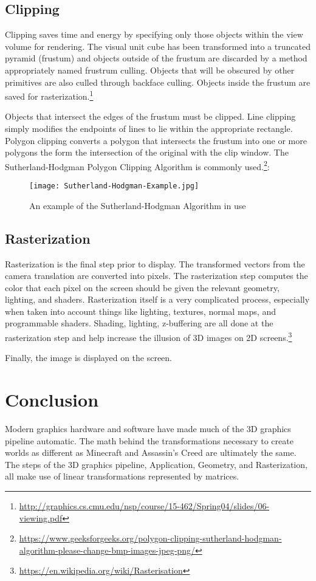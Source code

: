 \documentclass{article}
\begin{document}
\subsection{Clipping}
Clipping saves time and energy by specifying only those objects within the view volume for rendering. The visual unit cube has been transformed into a truncated pyramid (frustum) and objects outside of the frustum are discarded by a method appropriately named frustrum culling. Objects that will be obscured by other primitives are also culled through backface culling. Objects inside the frustum are saved for rasterization.\footnote{\url{http://graphics.cs.cmu.edu/nsp/course/15-462/Spring04/slides/06-viewing.pdf}}

Objects that intersect the edges of the frustum must be clipped. Line clipping simply modifies the endpoints of lines to lie within the appropriate rectangle. Polygon clipping converts a polygon that intersects the frustum into one or more polygons the form the intersection of the original with the clip window. The Sutherland-Hodgman Polygon Clipping Algorithm is commonly used.\footnote{\url{https://www.geeksforgeeks.org/polygon-clipping-sutherland-hodgman-algorithm-please-change-bmp-images-jpeg-png/}}:

\begin{figure}[H]
    \centering
    \texttt{[image: Sutherland-Hodgman-Example.jpg]}
    \caption{An example of the Sutherland-Hodgman Algorithm in use}
    \label{Sutherland-Hodgman}
\end{figure}

\subsection{Rasterization}
Rasterization is the final step prior to display. The transformed vectors from the camera translation are converted into pixels. The rasterization step computes the color that each pixel on the screen should be given the relevant geometry, lighting, and shaders. Rasterization itself is a very complicated process, especially when taken into account things like lighting, textures, normal maps, and programmable shaders. Shading, lighting, z-buffering are all done at the rasterization step and help increase the illusion of 3D images on 2D screens.\footnote{\url{https://en.wikipedia.org/wiki/Rasterisation}}

Finally, the image is displayed on the screen.

\section{Conclusion}
Modern graphics hardware and software have made much of the 3D graphics pipeline automatic. The math behind the transformations necessary to create worlds as different as Minecraft and Assassin's Creed are ultimately the same. The steps of the 3D graphics pipeline, Application, Geometry, and Rasterization, all make use of linear transformations represented by matrices.
\end{document}
